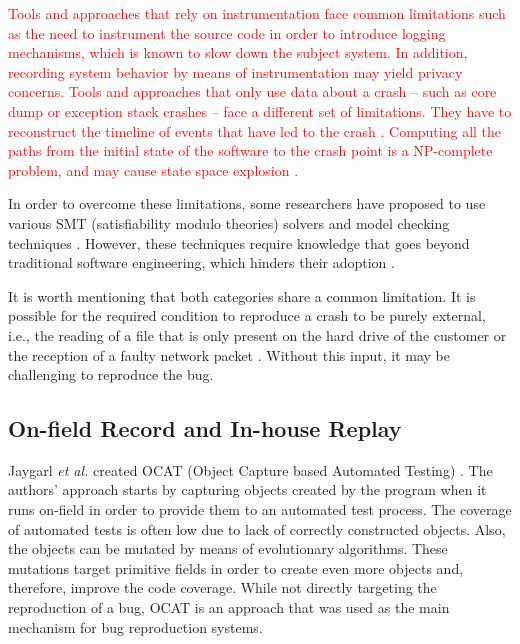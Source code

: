 \documentclass[times, doublespace]{smrauth}
\newcommand{\red}[1]{\textcolor{red}{#1}}
\begin{document}
\red{Tools and approaches that rely on instrumentation face common limitations such as the need to instrument the source code in order to introduce logging mechanisms\cite{Narayanasamy2005,Jaygarl,Artzi2008}, which is known to slow down the subject system.
In addition,  recording system behavior by means of instrumentation may yield privacy concerns.
Tools and approaches that only use data about a crash -- such as core dump or exception stack crashes -- face a different set of limitations. They have to reconstruct the timeline of events that have led to the crash \cite{Chen2013a,Nayrolles2015}. Computing all the paths from the initial state of the software to the crash point is a NP-complete problem, and may cause state space explosion \cite{Chen2013a,Clause2007}.}

In order to overcome these limitations, some researchers have proposed to
use various SMT (satisfiability modulo theories) solvers \cite{Dutertre2006}
and model checking techniques \cite{Visser2003}.
However, these techniques require knowledge that goes beyond traditional
software engineering, which hinders their adoption  \cite{Visser2004}.

It is worth mentioning that both categories share a common limitation.
It is possible for the required condition to reproduce a crash to be purely
external, i.e., the reading of a file that is only present on the hard
drive of the customer or the reception of a faulty network packet
\cite{Chen2013a, Nayrolles2015}.
Without this input, it may be challenging to reproduce the bug.



\subsection{On-field Record and In-house Replay}

Jaygarl {\it et al.} created OCAT (Object Capture based Automated Testing)
\cite{Jaygarl}.
The authors' approach starts by capturing objects created by the program when
it runs on-field in order to provide them to an automated test process.
The coverage of automated tests is often low due to lack of correctly
constructed objects. Also, the objects can be mutated by means of
evolutionary algorithms.
These mutations target primitive fields in order to create even more objects
and, therefore, improve the code coverage.
While not directly targeting the reproduction of a bug,
OCAT is an approach that was used as the main mechanism
for bug reproduction systems.
\end{document}
